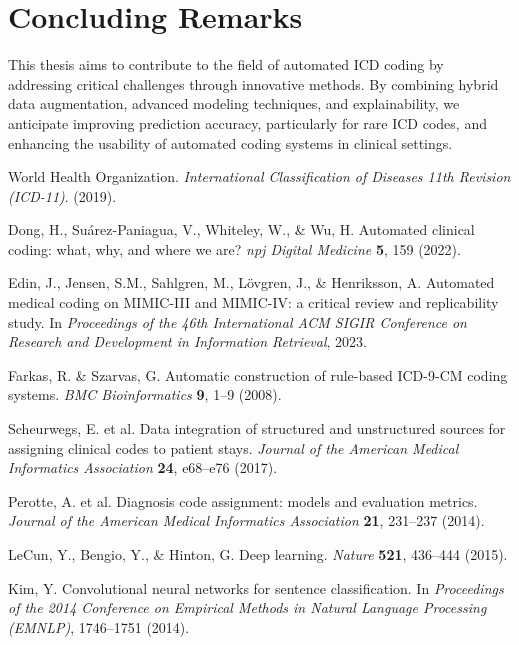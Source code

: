 \documentclass[12pt,a4paper]{report}
\begin{document}
\section{Concluding Remarks}
This thesis aims to contribute to the field of automated ICD coding by addressing critical challenges through innovative methods. By combining hybrid data augmentation, advanced modeling techniques, and explainability, we anticipate improving prediction accuracy, particularly for rare ICD codes, and enhancing the usability of automated coding systems in clinical settings.

\begin{thebibliography}{99}

World Health Organization. \textit{International Classification of Diseases 11th Revision (ICD-11)}. (2019).

Dong, H., Suárez-Paniagua, V., Whiteley, W., \& Wu, H. Automated clinical coding: what, why, and where we are? \textit{npj Digital Medicine} \textbf{5}, 159 (2022).

Edin, J., Jensen, S.M., Sahlgren, M., Lövgren, J., \& Henriksson, A. Automated medical coding on MIMIC-III and MIMIC-IV: a critical review and replicability study. In \textit{Proceedings of the 46th International ACM SIGIR Conference on Research and Development in Information Retrieval}, 2023.

Farkas, R. \& Szarvas, G. Automatic construction of rule-based ICD-9-CM coding systems. \textit{BMC Bioinformatics} \textbf{9}, 1–9 (2008).

Scheurwegs, E. et al. Data integration of structured and unstructured sources for assigning clinical codes to patient stays. \textit{Journal of the American Medical Informatics Association} \textbf{24}, e68–e76 (2017).

Perotte, A. et al. Diagnosis code assignment: models and evaluation metrics. \textit{Journal of the American Medical Informatics Association} \textbf{21}, 231–237 (2014).

LeCun, Y., Bengio, Y., \& Hinton, G. Deep learning. \textit{Nature} \textbf{521}, 436–444 (2015).

Kim, Y. Convolutional neural networks for sentence classification. In \textit{Proceedings of the 2014 Conference on Empirical Methods in Natural Language Processing (EMNLP)}, 1746–1751 (2014).


\end{thebibliography}
\end{document}
